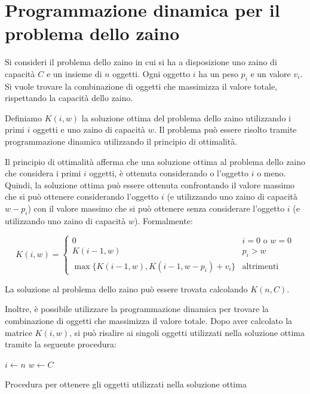 \section{Programmazione dinamica per il problema dello zaino}


Si consideri il problema dello zaino in cui si ha a disposizione uno zaino di capacità $C$ e un insieme di $n$ oggetti. Ogni oggetto $i$ ha un peso $p_i$ e un valore $v_i$. Si vuole trovare la combinazione di oggetti che massimizza il valore totale, rispettando la capacità dello zaino.

Definiamo $K(i, w)$ la soluzione ottima del problema dello zaino utilizzando i primi $i$ oggetti e uno zaino di capacità $w$. Il problema può essere risolto tramite programmazione dinamica utilizzando il principio di ottimalità.

Il principio di ottimalità afferma che una soluzione ottima al problema dello zaino che considera i primi $i$ oggetti, è ottenuta considerando o l'oggetto $i$ o meno. Quindi, la soluzione ottima può essere ottenuta confrontando il valore massimo che si può ottenere considerando l'oggetto $i$ (e utilizzando uno zaino di capacità $w-p_i$) con il valore massimo che si può ottenere senza considerare l'oggetto $i$ (e utilizzando uno zaino di capacità $w$). Formalmente:

\[
K(i, w) = 
\begin{cases} 
0 & i = 0 \text{ o } w = 0 \\
K(i-1, w) & p_i > w \\
\max \{ K(i-1, w), K(i-1, w-p_i) + v_i \} & \text{altrimenti}
\end{cases}
\]

La soluzione al problema dello zaino può essere trovata calcolando $K(n, C)$.

Inoltre, è possibile utilizzare la programmazione dinamica per trovare la combinazione di oggetti che massimizza il valore totale. Dopo aver calcolato la matrice $K(i,w)$, si può risalire ai singoli oggetti utilizzati nella soluzione ottima tramite la seguente procedura:

\begin{algorithm}[H]
\SetAlgoLined
{}
$i \leftarrow n$\;
$w \leftarrow C$\;
\caption{Procedura per ottenere gli oggetti utilizzati nella soluzione ottima}
\end{algorithm}


